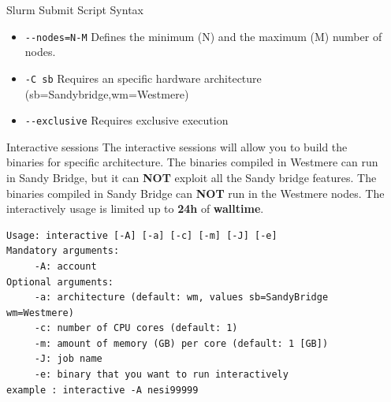 \documentclass[final,t]{beamer}
\begin{document}
\begin{frame}[fragile]{}
\begin{columns}[t]
\begin{column}{.35\linewidth}
\begin{block}{Slurm Submit Script Syntax}
\begin{itemize}
        \item \verb|--nodes=N-M| Defines the minimum (N) and the maximum (M) number of nodes.
        \item \verb|-C sb| Requires an specific hardware architecture (sb=Sandybridge,wm=Westmere)
        \item \verb|--exclusive| Requires exclusive execution
        \end{itemize}
      \end{block}

      \begin{block}{Interactive sessions}
      The interactive sessions will allow you to build the binaries for specific architecture. The binaries compiled in Westmere can run in Sandy Bridge, but it can \textbf{NOT} exploit all the Sandy bridge features. The binaries compiled in Sandy Bridge can \textbf{NOT} run in the Westmere nodes. The interactively usage is limited up to \textbf{24h} of \textbf{walltime}.
      \vspace*{-0.2cm}
	 \begin{verbatim}
Usage: interactive [-A] [-a] [-c] [-m] [-J] [-e]
Mandatory arguments:
	 -A: account
Optional arguments:
	 -a: architecture (default: wm, values sb=SandyBridge wm=Westmere)
	 -c: number of CPU cores (default: 1)
	 -m: amount of memory (GB) per core (default: 1 [GB])
	 -J: job name
	 -e: binary that you want to run interactively
example : interactive -A nesi99999
	\end{verbatim} 
      \end{block}


    \end{column}

    
    \begin{column}{.3\linewidth}
    


\end{column}
\end{columns}
\end{frame}
\end{document}
